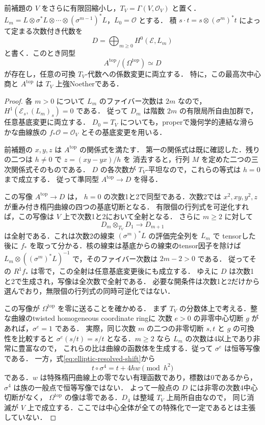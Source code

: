 \begin{theorem}\label{thm:elliptic-relative-thcr}
前補題の $V$ をさらに有限回縮小し，$T_V=\Gamma(V,\mathcal O_V)$ と置く．
$L_m=L\otimes\sigma^*L\otimes\cdots\otimes(\sigma^{m-1})^*L$，$L_0=\mathcal O$ とする．
積 $s\cdot t=s\otimes(\sigma^m)^*t$ によって定まる次数付き代数を
\[
 D=\bigoplus_{m\ge0}H^0(\mathcal E,L_m)
\]
と書く．このとき同型
\[
 A^{\mathrm{top}}/(\Omega^{\mathrm{top}})\simeq D
\]
が存在し，任意の可換 $T_V$-代数への係数変更に両立する．
特に，この最高次中心商と $A^{\mathrm{top}}$ は $T_V$ 上強Noetherである．
\end{theorem}
\begin{proof}
各 $m>0$ について $L_m$ のファイバー次数は $2m$ なので，
$H^1(\mathcal E_s,(L_m)_s)=0$ である．
従って $D_m$ は階数 $2m$ の有限局所自由加群で，任意基底変更に両立する．
$D_0=T_V$ についても，properで幾何学的連結な滑らかな曲線族の
$f_*\mathcal O=\mathcal O_V$ とその基底変更を用いる．

前補題の $x,y,z$ は $A^{\mathrm{top}}$ の関係式を満たす．
第一の関係式は既に確認した．残りの二つは $h\ne0$ で $z=(xy-yx)/h$ を
消去すると，行列 $M$ を定めた二つの三次関係式そのものである．
$D$ の各次数が $T_V$-平坦なので，これらの等式は $h=0$ まで成立する．
従って準同型 $A^{\mathrm{top}}\to D$ を得る．

この写像 $A^{\mathrm{top}}\to D$ は，
$h=0$ の次数1と2で同型である．次数2では
$x^2,xy,y^2,z$ が重み付き楕円曲線の四つの基底切断となる．
有限個の行列式を可逆化すれば，この写像は $V$ 上で次数1と2において全射となる．
さらに $m\ge2$ に対して
\[
 D_m\otimes_{T_V}D_1\longrightarrow D_{m+1}
\]
は全射である．これは次数2の線束 $(\sigma^m)^*L$ の評価完全列を $L_m$ で
tensorした後に $f_*$ を取って分かる．核の線束は基底からの線束のtensor因子を除けば
$L_m\otimes((\sigma^m)^*L)^{-1}$ で，そのファイバー次数は $2m-2>0$ である．
従ってその $R^1f_*$ は零で，この全射は任意基底変更後にも成立する．
ゆえに $D$ は次数1と2で生成され，写像は全次数で全射である．
必要な開条件は次数1と2だけから選んでおり，無限個の行列式の同時可逆化ではない．

この写像が $\Omega^{\mathrm{top}}$ を零に送ることを確かめる．
まず $T_V$ の分数体上で考える．整な曲線のtwisted homogeneous coordinate ringに
次数 $e>0$ の非零中心切断 $g$ があれば，$\sigma^e=1$ である．
実際，同じ次数 $m$ の二つの非零切断 $s,t$ と $g$ の可換性を比較すると
$\sigma^e(s/t)=s/t$ となる．$m\ge2$ なら $L_m$ の次数は4以上であり非常に豊富なので，
これらの比は曲線の函数体を生成する．従って $\sigma^e$ は恒等写像である．
一方，式\eqref{eq:elliptic-resolved-shift}から
\[
 t\circ\sigma^4=t+4hw\pmod {h^2}
\]
である．$w$ は特殊楕円曲線上の零でない有理函数であり，標数は0であるから，
$\sigma^4$ は族の一般点で恒等写像ではない．
よって一般点の $D$ には非零の次数4中心切断がなく，
$\Omega^{\mathrm{top}}$ の像は零である．$D_4$ は整域 $T_V$ 上局所自由なので，
同じ消滅が $V$ 上で成立する．ここでは中心全体が全ての特殊化で一定であるとは主張していない．


\end{proof}
